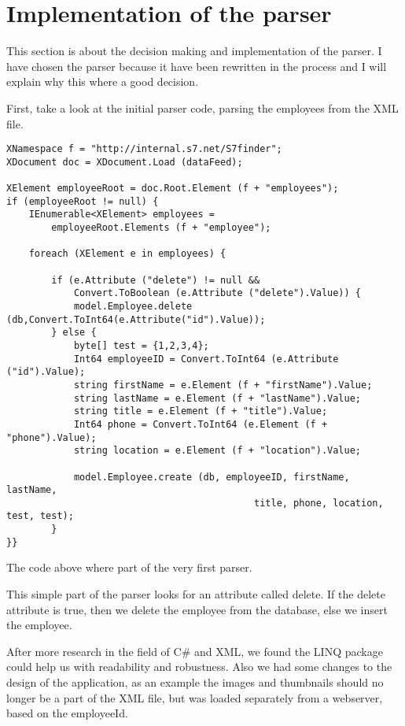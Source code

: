 \section{Implementation of the parser}
    This section is about the decision making and implementation of the parser.
    I have chosen the parser because it have been rewritten in the process and I
    will explain why this where a good decision.

    First, take a look at the initial parser code, parsing the employees from
    the XML file.
    \clearpage
    \begin{lstlisting}
XNamespace f = "http://internal.s7.net/S7finder";
XDocument doc = XDocument.Load (dataFeed);

XElement employeeRoot = doc.Root.Element (f + "employees");
if (employeeRoot != null) {
    IEnumerable<XElement> employees = 
        employeeRoot.Elements (f + "employee");

    foreach (XElement e in employees) {

        if (e.Attribute ("delete") != null && 
            Convert.ToBoolean (e.Attribute ("delete").Value)) {
            model.Employee.delete (db,Convert.ToInt64(e.Attribute("id").Value)); 
        } else {
            byte[] test = {1,2,3,4};
            Int64 employeeID = Convert.ToInt64 (e.Attribute ("id").Value);
            string firstName = e.Element (f + "firstName").Value;
            string lastName = e.Element (f + "lastName").Value;
            string title = e.Element (f + "title").Value;
            Int64 phone = Convert.ToInt64 (e.Element (f + "phone").Value);
            string location = e.Element (f + "location").Value;

            model.Employee.create (db, employeeID, firstName, lastName, 
                                            title, phone, location, test, test);    
        }
}}
    \end{lstlisting}
    The code above where part of the very first parser. 
    
    This simple part of the parser looks for an attribute called delete. If the
    delete attribute is true, then we delete the employee from the database,
    else we insert the employee.

    After more research in the field of C\# and XML, we found the LINQ package
    could help us with readability and robustness. Also we had some changes to
    the design of the application, as an example the images and thumbnails
    should no longer be a part of the XML file, but was loaded separately from
    a webserver, based on the employeeId.

